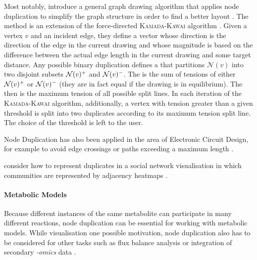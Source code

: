 \documentclass[
	fontsize=10pt, %
	twoside=false, %
	secnumdepth=1, %
]{kaobook}
\begin{document}
Most notably, \citeauthor{eades_VertexSplittingTensionfree_1996} introduce a
general graph drawing algorithm that applies node duplication to simplify the
graph structure in order to find a better layout
\cite{eades_VertexSplittingTensionfree_1996}. The method is an extension of the
force-directed \textsc{Kamada-Kawai} algorithm
\cite{kamada_AlgorithmDrawingGeneral_1989}. Given a vertex $v$ and an incident
edge, they define a  vector whose direction is the direction of the
edge in the current drawing and whose magnitude is based on the difference
between the actual edge length in the current drawing and some target distance.
Any possible binary duplication defines a  that partitions
$\mathcal{N}(v)$ into two disjoint subsets $\mathcal{N}(v)^+$ and $\mathcal{N}(v)^-$.
The  is the sum of tensions of either
$\mathcal{N}(v)^+$ or $\mathcal{N}(v)^-$ (they are in fact equal if the drawing is
in equilibrium). The  then is the maximum tension of all
possible split lines. In each iteration of the \textsc{Kamada-Kawai} algorithm,
additionally, a vertex with tension greater than a given threshold is split
into two duplicates according to its maximum tension split line. The choice of
the threshold is left to the user.

Node Duplication has also been applied in the area of Electronic Circuit Design,
for example to avoid edge crossings \cite{li_EliminateWireCrossings_2008} or
paths exceeding a maximum length \cite{paik_VertexSplittingDags_1998} \cite{mayer_GeneticAlgorithmsVertex_1993}.

\citeauthor{henr_ImprovingReadabilityClustered_2008}
 consider how to represent
duplicates in a social network visualisation in which communities are
represented by adjacency heatmaps
\cite{henr_ImprovingReadabilityClustered_2008}.


\paragraph{Metabolic Models}
Because different instances of the same metabolite can participate in many
different reactions, node duplication can be essential for working with
metabolic models. While visualisation one possible motivation, node duplication
also has to be considered for other tasks such as flux balance analysis
or integration of secondary \textit{-omics} data \cite{manipur_clustering_2020}.
\end{document}
